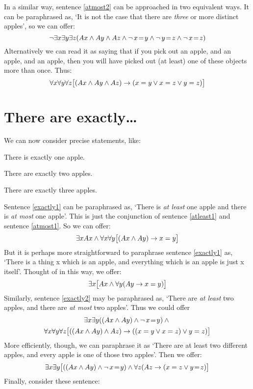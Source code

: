 In a similar way, sentence \ref{atmost2} can be approached in two equivalent ways. It can be paraphrased as, `It is not the case that there are \emph{three} or more distinct apples', so we can offer:
$$\neg \exists x \exists y\exists z(Ax \wedge Ay \wedge Az \wedge \neg\, x\!=\! y \wedge \neg\, y\!=\! z \wedge \neg\, x\!=\! z)$$
Alternatively we can read it as saying that if you pick out an apple, and an apple, and an apple, then you will have picked out (at least) one of these objects more than once. Thus:
$$\forall x\forall y\forall z\bigl[(Ax \wedge Ay \wedge Az) \rightarrow (x=y \vee x=z \vee y=z)\bigr]$$


\section{There are exactly\ldots}
We can now consider precise statements, like:
\begin{earg}
\item[\ex{exactly1}] There is exactly one apple.
\item[\ex{exactly2}] There are exactly two apples.
\item[\ex{exactly3}] There are exactly three apples.
\end{earg}
Sentence \ref{exactly1} can be paraphrased as, `There is \emph{at least} one apple and there is \emph{at most} one apple'. This is just the conjunction of sentence \ref{atleast1} and sentence \ref{atmost1}. So we can offer:
$$\exists x Ax \wedge \forall x\forall y\bigl[(Ax \wedge Ay) \rightarrow x=y\bigr]$$
But it is perhaps more straightforward to paraphrase sentence \ref{exactly1} as, `There is a thing x which is an apple, and everything which is an apple is just x itself'. Thought of in this way, we offer: 
$$\exists x\bigl[Ax \wedge \forall y(Ay \rightarrow x= y)\bigr]$$
Similarly, sentence \ref{exactly2} may be paraphrased as, `There are \emph{at least} two apples, and there are \emph{at most} two apples'. Thus we could offer 
\begin{multline*}
  \exists x \exists y((Ax \wedge Ay) \wedge \neg\, x\!=\! y) \wedge {}\\
  \forall x\forall y\forall z\bigl[((Ax \wedge Ay) \wedge Az) \rightarrow ((x=y \vee x=z) \vee y=z)\bigr]
\end{multline*}
More efficiently, though, we can paraphrase it as `There are at least two different apples, and every apple is one of those two apples'. Then we offer:
$$\exists x\exists y\bigl[((Ax \wedge Ay) \wedge \neg\, x\!=\! y) \wedge \forall z(Az \rightarrow ( x= z \vee y \!=\! z)\bigr]$$
Finally, consider these sentence:
